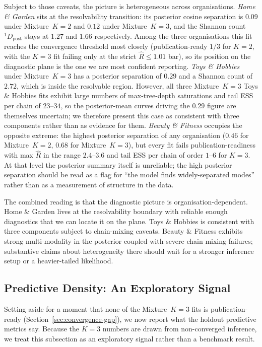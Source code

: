\documentclass[11pt]{article}
\begin{document}
Subject to those caveats, the picture is heterogeneous across organisations. \emph{Home \& Garden} sits at the resolvability transition: its posterior cosine separation is $0.09$ under Mixture~$K=2$ and $0.12$ under Mixture~$K=3$, and the Shannon count $^1\!D_{\text{post}}$ stays at $1.27$ and $1.66$ respectively. Among the three organisations this fit reaches the convergence threshold most closely (publication-ready $1/3$ for $K=2$, with the $K=3$ fit failing only at the strict $\widehat{R} \le 1.01$ bar), so its position on the diagnostic plane is the one we are most confident reporting. \emph{Toys \& Hobbies} under Mixture~$K=3$ has a posterior separation of $0.29$ and a Shannon count of $2.72$, which is inside the resolvable region. However, all three Mixture~$K=3$ Toys \& Hobbies fits exhibit large numbers of max-tree-depth saturations and tail ESS per chain of $23$--$34$, so the posterior-mean curves driving the $0.29$ figure are themselves uncertain; we therefore present this case as consistent with three components rather than as evidence for them. \emph{Beauty \& Fitness} occupies the opposite extreme: the highest posterior separation of any organisation ($0.46$ for Mixture~$K=2$, $0.68$ for Mixture~$K=3$), but every fit fails publication-readiness with max $\widehat{R}$ in the range $2.4$--$3.6$ and tail ESS per chain of order $1$--$6$ for $K=3$. At that level the posterior summary itself is unreliable; the high posterior separation should be read as a flag for ``the model finds widely-separated modes'' rather than as a measurement of structure in the data.

The combined reading is that the diagnostic picture is organisation-dependent. Home \& Garden lives at the resolvability boundary with reliable enough diagnostics that we can locate it on the plane. Toys \& Hobbies is consistent with three components subject to chain-mixing caveats. Beauty \& Fitness exhibits strong multi-modality in the posterior coupled with severe chain mixing failures; substantive claims about heterogeneity there should wait for a stronger inference setup or a heavier-tailed likelihood.

\subsection{Predictive Density: An Exploratory Signal}
\label{sec:real-predictive}

Setting aside for a moment that none of the Mixture~$K=3$ fits is publication-ready (Section~\ref{sec:convergence-gap}), we now report what the holdout predictive metrics say. Because the $K=3$ numbers are drawn from non-converged inference, we treat this subsection as an exploratory signal rather than a benchmark result.
\end{document}
